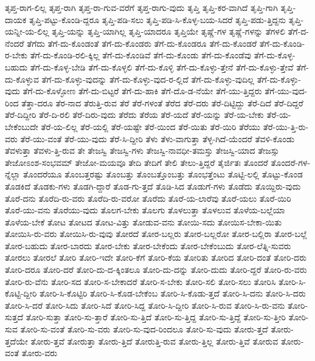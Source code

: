 {ತೃಪ್ತ-ರಾಗ-ಲಿಲ್ಲ
ತೃಪ್ತ-ರಾಗಿ
ತೃಪ್ತ-ರಾ-ಗುವ-ವರೆಗೆ
ತೃಪ್ತ-ರಾಗು-ವುದು
ತೃಪ್ತಿ
ತೃಪ್ತಿ-ಕರ-ವಾಗಿದೆ
ತೃಪ್ತಿ-ಗಾಗಿ
ತೃಪ್ತಿ-ದಾಯಕ
ತೃಪ್ತಿ-ಪಟ್ಟು-ಕೊಂಡಿ-ದ್ದರೂ
ತೃಪ್ತಿ-ಪಡಿ-ಸಲು
ತೃಪ್ತಿ-ಪಡಿ-ಸಿ-ಕೊಳ್ಳ-ಬಯ-ಸಿದರೆ
ತೃಪ್ತಿ-ಪಡು-ತ್ತಿದ್ದನು
ತೃಪ್ತಿ-ಯನ್ನೀ-ಯ-ಲಿಲ್ಲ
ತೃಪ್ತಿ-ಯನ್ನು
ತೃಪ್ತಿ-ಯಾಗಿಲ್ಲ
ತೃಪ್ತಿ-ಯಾದರೂ
ತೃಪ್ತಿಯೇ
ತೃಷ್ಣೆ-ಗಳ
ತೃಷ್ಣೆ-ಗಳನ್ನು
ತೆಗಳಲಿ
ತೆಗೆ-ದ-ನೆಂದರೆ
ತೆಗೆದು
ತೆಗೆ-ದು-ಕೊಂಡಂತೆ
ತೆಗೆ-ದು-ಕೊಂಡರು
ತೆಗೆ-ದು-ಕೊಂಡರೂ
ತೆಗೆ-ದು-ಕೊಂಡರೆ
ತೆಗೆ-ದು-ಕೊಂಡಿ-ರ-ಬೇಕು
ತೆಗೆ-ದು-ಕೊಂಡಿ-ರಲಿ-ಕ್ಕಿಲ್ಲ
ತೆಗೆ-ದು-ಕೊಂಡಿವೆ
ತೆಗೆ-ದು-ಕೊಂಡು
ತೆಗೆ-ದು-ಕೊಂಡೆವು
ತೆಗೆ-ದು-ಕೊಳ್ಳ-ಬಹುದು
ತೆಗೆ-ದು-ಕೊಳ್ಳ-ಬೇಡಿ
ತೆಗೆ-ದು-ಕೊಳ್ಳಲಿ
ತೆಗೆ-ದು-ಕೊಳ್ಳಿ
ತೆಗೆ-ದು-ಕೊಳ್ಳು-ತ್ತೇನೆ
ತೆಗೆ-ದು-ಕೊಳ್ಳು-ತ್ತೇವೆ
ತೆಗೆ-ದು-ಕೊಳ್ಳುವ
ತೆಗೆ-ದು-ಕೊಳ್ಳು-ವುದನ್ನು
ತೆಗೆ-ದು-ಕೊಳ್ಳು-ವುದ-ರ-ಲ್ಲಿದೆ
ತೆಗೆ-ದು-ಕೊಳ್ಳು-ವುದಿಲ್ಲ
ತೆಗೆ-ದು-ಕೊಳ್ಳು-ವುದು
ತೆಗೆ-ದು-ಕೊಳ್ಳೋಣ
ತೆಗೆ-ದು-ಬಿಟ್ಟರೆ
ತೆಗೆ-ದು-ಹಾಕಿ
ತೆಗೆ-ದೊ-ಡ-ನೆಯೇ
ತೆಗೆ-ಯು-ತ್ತಿದ್ದರು
ತೆಗೆ-ಯು-ವುದ-ರಿಂದ
ತೆತ್ತಾ-ದರೂ
ತೆರ-ನಾದ
ತೆರುತ್ತಿ-ರುವ
ತೆರೆ
ತೆರೆ-ಗಳಂತೆ
ತೆರೆದ
ತೆರೆ-ದರು
ತೆರೆ-ದಿಟ್ಟಿದ್ದು
ತೆರೆ-ದಿದೆ
ತೆರೆ-ದಿದ್ದರೆ
ತೆರೆ-ದಿದ್ದೀರಿ
ತೆರೆ-ದಿ-ರಲಿ
ತೆರೆ-ದಿರು-ವುದು
ತೆರೆದು
ತೆರೆಯ
ತೆರೆ-ಯದೆ
ತೆರೆ-ಯನ್ನು
ತೆರೆ-ಯ-ಬೇಕು
ತೆರೆ-ಯ-ಬೇಕೆಂಬುದೇ
ತೆರೆ-ಯ-ಲಿಲ್ಲ
ತೆರೆ-ಯಲ್ಲಿ
ತೆರೆ-ಯಷ್ಟೇ
ತೆರೆ-ಯಿಂದ
ತೆರೆ-ಯಿತು
ತೆರೆ-ಯಿರಿ
ತೆರೆಯು
ತೆರೆ-ಯು-ತ್ತಿ-ರು-ವರು
ತೆರೆ-ಯು-ವಂತೆ
ತೆರೆ-ಯು-ವುದು
ತೆರೆ-ಸಿ-ದ್ದೀರಿ
ತೆಳು
ತೆಳು-ವಾಗುತ್ತಾ
ತೆಳ್ಳ-ಗಿದೆ-ಯೆಂದರೆ
ತೆವಳಿ-ಕೊಂಡು
ತೆವಳುತ್ತಾ
ತೆವಳು-ತ್ತಿ-ರುವ
ತೇ
ತೇಜಸ್ವಿ
ತೇಜಸ್ವಿ-ಗಳು
ತೇಜಸ್ವಿ-ನಾವಧೀ-ತಮಸ್ತು
ತೇಜಸ್ವಿ-ಯಾದ
ತೇಜಸ್ಸು
ತೇಜೋಽಂಶ-ಸಂಭವಮ್
ತೇಜೋ-ಮಯವೂ
ತೇದಿ
ತೇದಿಗೆ
ತೇಲಿ
ತೇಲು-ತ್ತಿದ್ದರೆ
ತೈರ್ಜಿತಃ
ತೊಂದರೆ
ತೊಂದರೆ-ಗಳ-ನ್ನೆಲ್ಲಾ
ತೊಂದರೆಯೂ
ತೊಂಬತ್ತರಷ್ಟು
ತೊಂಬತ್ತು
ತೊಂಬತ್ತೊಂಬತ್ತು
ತೊಂಭತ್ತೆಂಟು
ತೊಟ್ಟಿ-ಲಲ್ಲಿ
ತೊಟ್ಟು-ಕೊಂಡ
ತೊಡಕಿದೆ
ತೊಡಕು-ಗಳು
ತೊಡಗಿ-ದ್ದಾರೆ
ತೊಡ-ಗು-ತ್ತದೆ
ತೊಡಿ-ಸಿದ
ತೊಡುಗೆ-ಗಳು
ತೊಡೆದು
ತೊಯ್ದಿರು-ವುದು
ತೊರೆ-ದನು
ತೊರೆದಿ-ರು-ವರು
ತೊರೆದಿ-ರು-ವರೋ
ತೊರೆದು
ತೊರೆ-ಯ-ಲಾರೆವು
ತೊರೆ-ಯಲು
ತೊರೆ-ಯಿರಿ
ತೊರೆ-ಯು-ವನು
ತೊರೆಯು-ವುದು
ತೊಲಗ-ಬೇಕು
ತೊಲಗು
ತೊಳಲುತ್ತಾ
ತೊಳಲುವ
ತೊಳೆಯ-ಬಲ್ಲೆಯಾ
ತೊಳೆಯ-ಬೇಕೆ
ತೋಟ
ತೋಟದ
ತೋಟ-ವಿತ್ತು
ತೋಡುವ-ವನು
ತೋಯಿ-ಸದು
ತೋಯಿಸ-ಬೇಕಾ-ಯಿತು
ತೋಯಿಸಿ-ರು-ವರು
ತೋಯಿಸಿ-ರು-ವುವು
ತೋರದೆ
ತೋರ-ಬಲ್ಲರು
ತೋರ-ಬಲ್ಲರೋ
ತೋರ-ಬಲ್ಲಿರಾ
ತೋರ-ಬಲ್ಲೆ
ತೋರ-ಬಹುದು
ತೋರ-ಬಾರದು
ತೋರ-ಬೇಕು
ತೋರ-ಬೇಕೆಂದು
ತೋರ-ಬೇಕೆಂಬುದು
ತೋರ-ಲೆತ್ನಿ-ಸುವರು
ತೋರಲು
ತೋರಲೆ
ತೋರಿ
ತೋರಿ-ಇದೇ
ತೋರಿ-ಕೆಗೆ
ತೋರಿ-ಕೆಯ
ತೋರಿತು
ತೋರಿದ
ತೋರಿ-ದಂತೆ
ತೋರಿ-ದರು
ತೋರಿ-ದರೂ
ತೋರಿ-ದರೆ
ತೋರಿ-ದು-ದ-ಕ್ಕಿಂತಲೂ
ತೋರಿ-ದು-ದನ್ನು
ತೋರಿ-ದುದು
ತೋರಿ-ದ್ದರೆ
ತೋರಿ-ರು-ವರು
ತೋರಿ-ರು-ವೆನು
ತೋರಿ-ಸದ
ತೋರಿ-ಸ-ಬೇಕಾದರೆ
ತೋರಿ-ಸ-ಬೇಕು
ತೋರಿ-ಸಲಿ
ತೋರಿ-ಸಲು
ತೋರಿಸಿ
ತೋರಿ-ಸಿ-ಕೊಟ್ಟಿ-ದ್ದೀರಿ
ತೋರಿ-ಸಿ-ಕೊಟ್ಟಿರಿ
ತೋರಿ-ಸಿ-ಕೊಡ-ಬೇಕೆಂಬ
ತೋರಿ-ಸಿ-ಕೊಡು-ತ್ತದೆ
ತೋರಿ-ಸಿ-ದನು
ತೋರಿ-ಸಿ-ದರು
ತೋರಿ-ಸಿ-ದರೆ
ತೋರಿ-ಸಿದು
ತೋರಿ-ಸಿದೆ
ತೋರಿ-ಸಿದ್ದ
ತೋರಿ-ಸಿ-ದ್ದೀರಿ
ತೋರಿ-ಸಿ-ರುವ
ತೋರಿ-ಸಿ-ರು-ವನು
ತೋರಿ-ಸುತ್ತದೆ
ತೋರಿ-ಸುತ್ತಾ
ತೋರಿ-ಸು-ತ್ತಾರೆ
ತೋರಿ-ಸು-ತ್ತಿದೆ
ತೋರಿ-ಸು-ತ್ತಿದ್ದ
ತೋರಿ-ಸು-ತ್ತಿದ್ದೆ
ತೋರಿ-ಸು-ತ್ತೀರಿ
ತೋರಿ-ಸುವ
ತೋರಿ-ಸು-ವಂತೆ
ತೋರಿ-ಸು-ವರು
ತೋರಿ-ಸು-ವುದ-ರಿಂದಲೂ
ತೋರಿ-ಸು-ವುದು
ತೋರು-ತ್ತದೆ
ತೋರು-ತ್ತದೆಯೇ
ತೋರು-ತ್ತವೆ
ತೋರುತ್ತಾ
ತೋರು-ತ್ತಿದೆ
ತೋರುತ್ತಿ-ರುವ
ತೋರು-ತ್ತಿಲ್ಲ
ತೋರು-ತ್ತಿವೆ
ತೋರುವ
ತೋರು-ವಂತೆ
ತೋರು-ವರು
}
